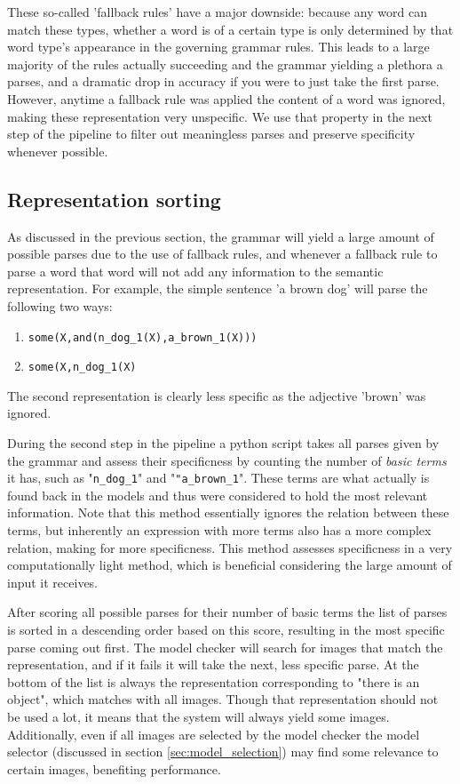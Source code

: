 These so-called 'fallback rules' have a major downside: because any word can match these types, whether a word is of a certain type is only determined by that word type's appearance in the governing grammar rules. This leads to a large majority of the rules actually succeeding and the grammar yielding a plethora a parses, and a dramatic drop in accuracy if you were to just take the first parse. However, anytime a fallback rule was applied the content of a word was ignored, making these representation very unspecific. We use that property in the next step of the pipeline to filter out meaningless parses and preserve specificity whenever possible.

\subsection{Representation sorting}
As discussed in the previous section, the grammar will yield a large amount of possible parses due to the use of fallback rules, and whenever a fallback rule to parse a word that word will not add any information to the semantic representation. For example, the simple sentence 'a brown dog' will parse the following two ways:
\begin{enumerate}
    \item \texttt{some(X,and(n\_dog\_1(X),a\_brown\_1(X)))}
    \item \texttt{some(X,n\_dog\_1(X)}
\end{enumerate}
The second representation is clearly less specific as the adjective 'brown' was ignored.

During the second step in the pipeline a python script takes all parses given by the grammar and assess their specificness by counting the number of \emph{basic terms} it has, such as "\texttt{n\_dog\_1}" and "\texttt{"a\_brown\_1}". These terms are what actually is found back in the models and thus were considered to hold the most relevant information. Note that this method essentially ignores the relation between these terms, but inherently an expression with more terms also has a more complex relation, making for more specificness. This method assesses specificness in a very computationally light method, which is beneficial considering the large amount of input it receives.

After scoring all possible parses for their number of basic terms the list of parses is sorted in a descending order based on this score, resulting in the most specific parse coming out first. The model checker will search for images that match the representation, and if it fails it will take the next, less specific parse. At the bottom of the list is always the representation corresponding to "there is an object", which matches with all images. Though that representation should not be used a lot, it means that the system will always yield some images. Additionally, even if all images are selected by the model checker the model selector (discussed in section \ref{sec:model_selection}) may find some relevance to certain images, benefiting performance.

